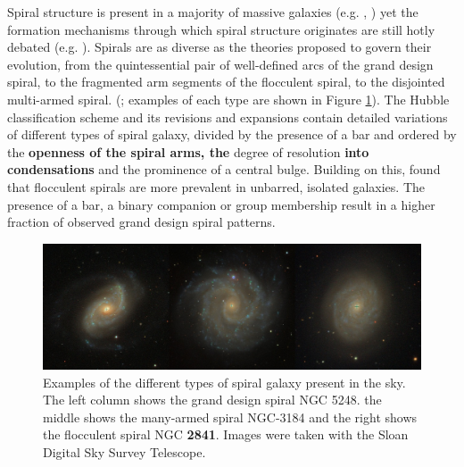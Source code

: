 
Spiral structure is present in a majority of massive galaxies (e.g. \citealt{1989gadv.book..151B}, \citealt{2008MNRAS.389.1179L}) yet the formation mechanisms through which spiral structure originates are still hotly debated (e.g. \citealt{2014PASA...31...35D}). Spirals are as diverse as the theories proposed to govern their evolution, from the quintessential pair of well-defined arcs of the grand design spiral, to the fragmented arm segments of the flocculent spiral, to the disjointed multi-armed spiral.
(\citealt{2011ApJ...737...32E}; examples of each type are shown in Figure \ref{fig:spiral-galaxy-types}). The Hubble classification scheme \citep{1926ApJ....64..321H} and its revisions and expansions \citep{1961hag..book.....S,1991rc3..book.....D} contain detailed variations of different types of spiral galaxy, divided by the presence of a bar and ordered by the \textbf{openness of the spiral arms, the} degree of resolution \textbf{into condensations} and the prominence of a central bulge. Building on this, \citet{1982MNRAS.201.1021E} found that flocculent spirals are more prevalent in unbarred, isolated galaxies. The presence of a bar, a binary companion or group membership result in a higher fraction of observed grand design spiral patterns.

\begin{figure}
  \includegraphics[width=15cm]{plots/galaxy_types.jpg}
  \caption{Examples of the different types of spiral galaxy present in the sky. The left column shows the grand design spiral NGC 5248. the middle shows the many-armed spiral NGC-3184 and the right shows the flocculent spiral NGC {\bf 2841}. Images were taken with the Sloan Digital Sky Survey Telescope.}
  \label{fig:spiral-galaxy-types}
\end{figure}

